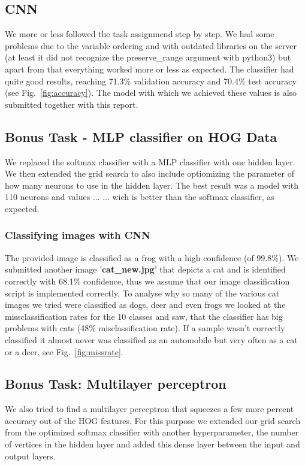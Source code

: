 \subsection{CNN}
We more or less followed the task assignmend step by step. We had some problems due to the variable ordering and with outdated libraries on the server (at least it did not recognize the preserve\_range argument with python3) but apart from that everything worked more or less as expected. The classifier had quite good results, reaching 71.3\% validation accuracy and 70.4\% test accuracy (see Fig.~\ref{fig:accuracy}). The model with which we achieved these values is also submitted together with this report.

\subsection{Bonus Task - MLP classifier on HOG Data}
We replaced the softmax classifier with a MLP classifier with one hidden layer. We then extended the grid search to also include optiomizing the parameter of how many neurons to use in the hidden layer. The best result was a model with 110 neurons and values ... ... wich is better than the softmax classifier, as expected.

\subsubsection{Classifying images with CNN}
The provided image is classified as a frog with a high confidence (of 99.8\%). We submitted another image '\textbf{cat\_new.jpg}' that depicts a cat and is identified correctly with 68.1\% confidence, thus we assume that our image classification script is implemented correctly.
To analyse why so many of the various cat images we tried were classified as dogs, deer and even frogs we looked at the missclassification rates for the 10 classes and saw, that the classifier has big problems with cats (48\% misclassification rate). If a sample wasn't correctly classified it almost never was classified as an automobile but very often as a cat or a deer, see Fig.~\ref{fig:missrate}.

\subsection{Bonus Task: Multilayer perceptron}
We also tried to find a multilayer perceptron that squeezes a few more percent accuracy out of the HOG features.  For this purpose we extended our grid search from the optimized softmax classifier with another hyperparameter, the number of vertices in the hidden layer and added this dense layer between the input and output layers. 

